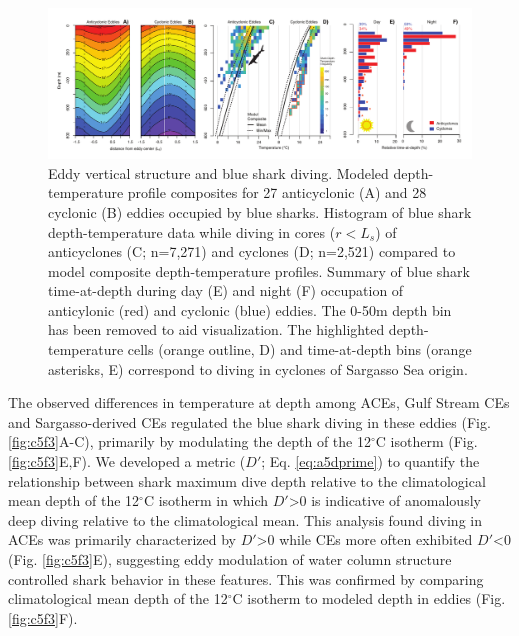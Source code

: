 \begin{landscape}
\begin{figure}[htbp]
\centering
\includegraphics[width=9in]{images/C5_Fig2.pdf}
\caption[Eddy vertical structure and blue shark diving]{Eddy vertical structure and blue shark diving. Modeled depth-temperature profile composites for 27 anticyclonic (A) and 28 cyclonic (B) eddies occupied by blue sharks. Histogram of blue shark depth-temperature data while diving in cores ($r < L_s$) of anticyclones (C; n=7,271) and cyclones (D; n=2,521) compared to model composite depth-temperature profiles. Summary of blue shark time-at-depth during day (E) and night (F) occupation of anticylonic (red) and cyclonic (blue) eddies. The 0-50m depth bin has been removed to aid visualization. The highlighted depth-temperature cells (orange outline, D) and time-at-depth bins (orange asterisks, E) correspond to diving in cyclones of Sargasso Sea origin.}
\label{fig:c5f2}
\end{figure}
\end{landscape}
\clearpage

The observed differences in temperature at depth among ACEs, Gulf Stream CEs and Sargasso-derived CEs regulated the blue shark diving in these eddies (Fig. \ref{fig:c5f3}A-C), primarily by modulating the depth of the 12$^\circ$C isotherm (Fig. \ref{fig:c5f3}E,F). We developed a metric ($D'$; Eq. \ref{eq:a5dprime}) to quantify the relationship between shark maximum dive depth relative to the climatological mean depth of the 12$^\circ$C isotherm in which $D'$>0 is indicative of anomalously deep diving relative to the climatological mean. This analysis found diving in ACEs was primarily characterized by $D'$>0 while CEs more often exhibited $D'$<0 (Fig. \ref{fig:c5f3}E), suggesting eddy modulation of water column structure controlled shark behavior in these features. This was confirmed by comparing climatological mean depth of the 12$^\circ$C isotherm to modeled \is depth in eddies (Fig. \ref{fig:c5f3}F).

